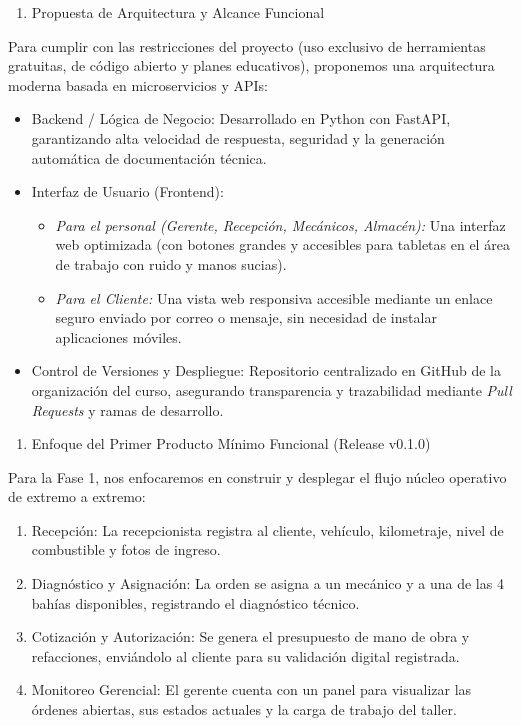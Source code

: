 \documentclass[
  spanish,
  11pt,
  letterpaper,
]{article}
\begin{document}
\begin{enumerate}
\def\labelenumi{\arabic{enumi}.}
\setcounter{enumi}{3}
\item
  Propuesta de Arquitectura y Alcance Funcional
\end{enumerate}

Para cumplir con las restricciones del proyecto (uso exclusivo de
herramientas gratuitas, de código abierto y planes educativos),
proponemos una arquitectura moderna basada en microservicios y APIs:

\begin{itemize}
\item
  Backend / Lógica de Negocio: Desarrollado en Python con FastAPI,
  garantizando alta velocidad de respuesta, seguridad y la generación
  automática de documentación técnica.
\item
  Interfaz de Usuario (Frontend):

  \begin{itemize}
  \item
    \emph{Para el personal (Gerente, Recepción, Mecánicos, Almacén):}
    Una interfaz web optimizada (con botones grandes y accesibles para
    tabletas en el área de trabajo con ruido y manos sucias).
  \item
    \emph{Para el Cliente:} Una vista web responsiva accesible mediante
    un enlace seguro enviado por correo o mensaje, sin necesidad de
    instalar aplicaciones móviles.
  \end{itemize}
\item
  Control de Versiones y Despliegue: Repositorio centralizado en GitHub
  de la organización del curso, asegurando transparencia y trazabilidad
  mediante \emph{Pull Requests} y ramas de desarrollo.
\end{itemize}

\begin{enumerate}
\def\labelenumi{\arabic{enumi}.}
\setcounter{enumi}{4}
\item
  Enfoque del Primer Producto Mínimo Funcional (Release v0.1.0)
\end{enumerate}

Para la Fase 1, nos enfocaremos en construir y desplegar el flujo núcleo
operativo de extremo a extremo:

\begin{enumerate}
\def\labelenumi{\arabic{enumi}.}
\item
  Recepción: La recepcionista registra al cliente, vehículo,
  kilometraje, nivel de combustible y fotos de ingreso.
\item
  Diagnóstico y Asignación: La orden se asigna a un mecánico y a una de
  las 4 bahías disponibles, registrando el diagnóstico técnico.
\item
  Cotización y Autorización: Se genera el presupuesto de mano de obra y
  refacciones, enviándolo al cliente para su validación digital
  registrada.
\item
  Monitoreo Gerencial: El gerente cuenta con un panel para visualizar
  las órdenes abiertas, sus estados actuales y la carga de trabajo del
  taller.
\end{enumerate}
\end{document}
